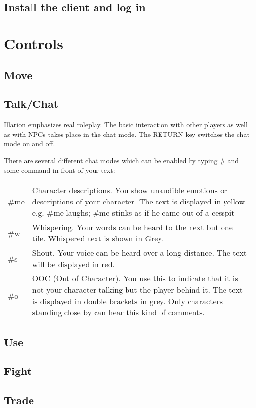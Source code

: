 \documentclass[a4paper,11pt]{scrreprt}
\begin{document}
\section{Install the client and log in}

\chapter{Controls}
\section{Move}
\section{Talk/Chat}
Illarion emphasizes real roleplay. The basic interaction with other players as well as with NPCs 
takes place in the chat mode. The RETURN key switches the chat mode on and off.

There are several different chat modes which can be enabled by typing \# and some command in front of your text:
\begin{table}[h]
\begin{tabular}{ l p{14.5cm}}
\#me & Character descriptions. 
You show unaudible emotions or descriptions of your character. The text is displayed in yellow. 
e.g.  \#me laughs; \#me stinks as if he came out of a cesspit \\
\#w & Whispering. Your words can be heard to the next but one tile. Whispered text is shown in Grey. \\
\#s & Shout. 
Your voice can be heard over a long distance. The text will be displayed in red. \\
\#o & OOC (Out of Character). 
You use this to indicate that it is not your character talking but the player behind it. The text 
is displayed in double brackets in grey. Only characters standing close by can hear this kind of comments.
\end{tabular}
\end{table}

\section{Use}
\section{Fight}
\section{Trade}
\end{document}
